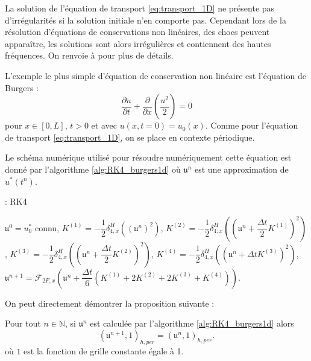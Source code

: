 La solution de l'équation de transport \eqref{eq:transport_1D} ne présente pas d'irrégularités si la solution initiale n'en comporte pas. Cependant lors de la résolution d'équations de conservations non linéaires, des chocs peuvent apparaître, les solutions sont alors irrégulières et contiennent des hautes fréquences. On renvoie à \cite{Witham1974} pour plus de détails.

L'exemple le plus simple d'équation de conservation non linéaire est l'équation de Burgers :
\begin{equation}
\dfrac{\partial u}{\partial t} + \dfrac{\partial}{\partial x} \left( \dfrac{u^2}{2}  \right) = 0
\label{eq:burgers_1D}
\end{equation}
pour $x \in [0,L]$, $t>0$ et avec $u(x,t=0)=u_0(x)$. Comme pour l'équation de transport \eqref{eq:transport_1D}, on se place en contexte périodique.

Le schéma numérique utilisé pour résoudre numériquement cette équation est donné par l'algorithme \ref{alg:RK4_burgers1d} où $\mathfrak{u}^n$ est une approximation de $u^*(t^n)$.
\begin{center}
\begin{minipage}[H]{12cm}
  \begin{algorithm}[H]
    \caption{: RK4}\label{alg:RK4_burgers1d}
    \begin{algorithmic}[1]
    \State $\mathfrak{u}^0 = u_0^*$ connu,
             \State  $K^{(1)} = - \dfrac{1}{2}\delta_{4,x}^H \left(\left( \mathfrak{u}^n \right)^2\right)$,
             \State  $K^{(2)} = - \dfrac{1}{2}\delta_{4,x}^H \left(\left( \mathfrak{u}^n + \dfrac{\Delta t}{2} K^{(1)}\right)^2\right)$,
             \State  $K^{(3)} = - \dfrac{1}{2}\delta_{4,x}^H \left(\left( \mathfrak{u}^n + \dfrac{\Delta t}{2} K^{(2)}\right)^2\right)$,
             \State  $K^{(4)} = - \dfrac{1}{2}\delta_{4,x}^H \left(\left( \mathfrak{u}^n + \Delta t K^{(3)}\right)^2\right)$,  
             \State  $\mathfrak{u}^{n+1} = \mathcal{F}_{2F,x}\left( \mathfrak{u}^n  + \dfrac{\Delta t}{6} \left( K^{(1)} + 2 K^{(2)} + 2 K^{(3)} + K^{(4)} \right) \right)$.
            \EndFor
    \end{algorithmic}
    \end{algorithm}
\end{minipage}
\end{center}

On peut directement démontrer la proposition suivante :
\begin{proposition}
Pour tout $n \in \mathbb{N}$, si $\mathfrak{u}^n$ est calculée par l'algorithme \ref{alg:RK4_burgers1d} alors
\begin{equation}
(\mathfrak{u}^{n+1}, \mathfrak{1})_{h,per} = (\mathfrak{u}^n, \mathfrak{1})_{h,per}.
\end{equation}
où $\mathfrak{1}$ est la fonction de grille constante égale à 1.
\end{proposition}

